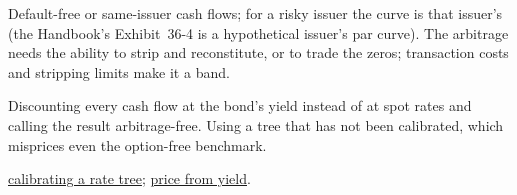 \begin{qfmethod}
 Default-free or same-issuer cash flows; for a risky issuer the curve is that issuer's (the Handbook's Exhibit~36-4 is a hypothetical issuer's par curve). The arbitrage needs the ability to strip and reconstitute, or to trade the zeros; transaction costs and stripping limits make it a band.

 Discounting every cash flow at the bond's yield instead of at spot rates and calling the result arbitrage-free. Using a tree that has not been calibrated, which misprices even the option-free benchmark.

 \hyperref[meth:binomial-rate-tree-calibration]{calibrating a rate tree}; \hyperref[meth:bond-price-from-yield]{price from yield}.

\end{qfmethod}

